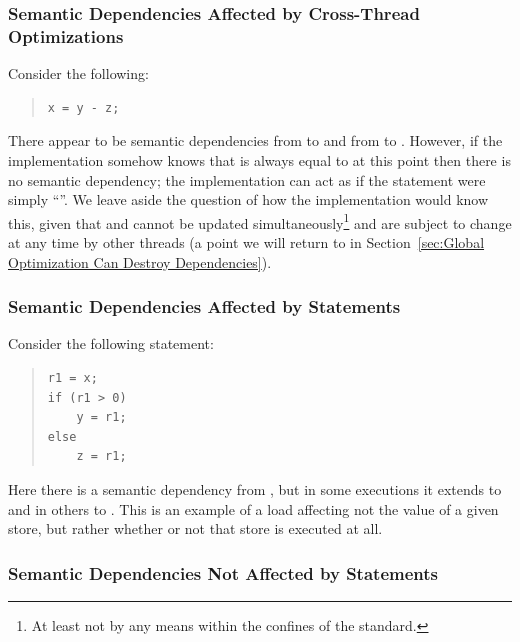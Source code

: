 \documentclass[10]{article}
\begin{document}
\subsubsection{Semantic Dependencies Affected by Cross-Thread Optimizations}
\label{sec:Semantic Dependencies Affected by Cross-Thread Optimizations}

Consider the following:
\begin{quote}
\begin{verbatim}
x = y - z;
\end{verbatim}
\end{quote}
There appear to be semantic dependencies from  to  and from 
to .
However, if the implementation somehow knows that  is
always equal to  at this point then there is no semantic dependency;
the implementation can act as if the statement were simply ``''.
We leave aside the question of how the implementation would know this,
given that  and  cannot be updated simultaneously\footnote{
	At least not by any means within the confines of the standard.}
and are subject to change at any time by
other threads (a point we will return to in
Section~\ref{sec:Global Optimization Can Destroy Dependencies}).

\subsubsection{Semantic Dependencies Affected by  Statements}
\label{sec:Semantic Dependencies Affected by if Statements}

Consider the following  statement:
\begin{quote}
\begin{verbatim}
r1 = x;
if (r1 > 0)
    y = r1;
else
    z = r1;
\end{verbatim}
\end{quote}
Here there is a semantic dependency from , but in some executions
it extends to  and in others to .
This is an example of a load affecting not the value of
a given store, but rather whether or not that store is executed at all.

\subsubsection{Semantic Dependencies Not Affected by  Statements}
\label{sec:Semantic Dependencies Not Affected by if Statements}
\end{document}
